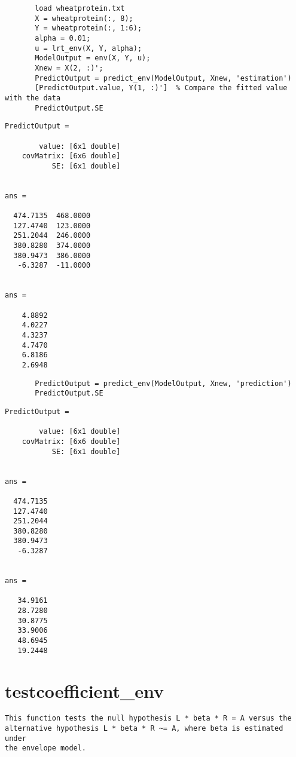 \documentclass[a4paper,11pt,openany]{memoir}
\begin{document}
\begin{verbatim}       load wheatprotein.txt
       X = wheatprotein(:, 8);
       Y = wheatprotein(:, 1:6);
       alpha = 0.01;
       u = lrt_env(X, Y, alpha);
       ModelOutput = env(X, Y, u);
       Xnew = X(2, :)';
       PredictOutput = predict_env(ModelOutput, Xnew, 'estimation')
       [PredictOutput.value, Y(1, :)']  % Compare the fitted value with the data
       PredictOutput.SE
       \end{verbatim}
        \color{lightgray}\ttfamily \begin{verbatim}
PredictOutput = 

        value: [6x1 double]
    covMatrix: [6x6 double]
           SE: [6x1 double]


ans =

  474.7135  468.0000
  127.4740  123.0000
  251.2044  246.0000
  380.8280  374.0000
  380.9473  386.0000
   -6.3287  -11.0000


ans =

    4.8892
    4.0227
    4.3237
    4.7470
    6.8186
    2.6948
\end{verbatim} \rmfamily
\color{black}
       \begin{verbatim}
       PredictOutput = predict_env(ModelOutput, Xnew, 'prediction')
       PredictOutput.SE\end{verbatim}
            \color{lightgray}\ttfamily \begin{verbatim}
PredictOutput = 

        value: [6x1 double]
    covMatrix: [6x6 double]
           SE: [6x1 double]


ans =

  474.7135
  127.4740
  251.2044
  380.8280
  380.9473
   -6.3287


ans =

   34.9161
   28.7280
   30.8775
   33.9006
   48.6945
   19.2448
\end{verbatim} \rmfamily
\color{black}
 
\newpage


\rmfamily
\color{black}\section{testcoefficient\_env}


\begin{verbatim}This function tests the null hypothesis L * beta * R = A versus the
alternative hypothesis L * beta * R ~= A, where beta is estimated under
the envelope model.\end{verbatim}
    
\end{document}
